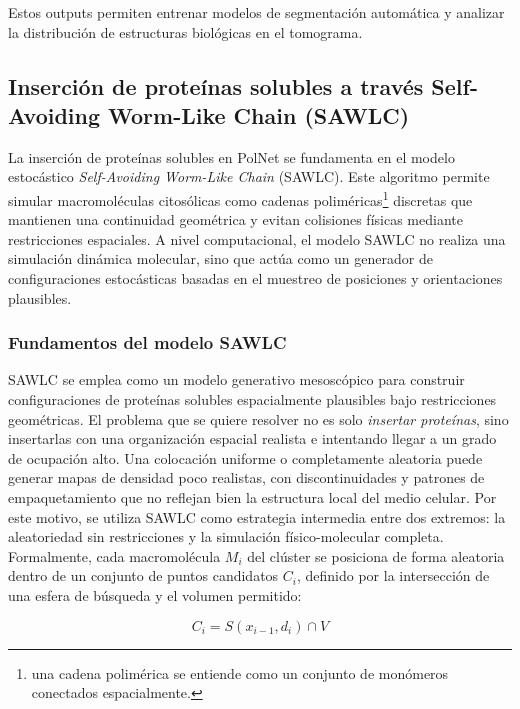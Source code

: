 Estos outputs permiten entrenar modelos de segmentación automática y analizar la distribución de estructuras biológicas en el tomograma.

\subsection{Inserción de proteínas solubles a través Self-Avoiding Worm-Like Chain (SAWLC)}

La inserción de proteínas solubles en PolNet se fundamenta en el modelo estocástico \textit{Self-Avoiding Worm-Like Chain} (SAWLC). Este algoritmo permite simular macromoléculas citosólicas como {cadenas poliméricas}\footnote{una cadena polimérica se entiende como un conjunto de monómeros conectados espacialmente.} discretas que mantienen una continuidad geométrica y evitan colisiones físicas mediante restricciones espaciales. A nivel computacional, el modelo SAWLC no realiza una simulación dinámica molecular, sino que actúa como un generador de configuraciones estocásticas basadas en el muestreo de posiciones y orientaciones plausibles.


\subsubsection{Fundamentos del modelo SAWLC}

SAWLC se emplea como un modelo generativo mesoscópico para construir configuraciones de proteínas solubles espacialmente plausibles bajo restricciones geométricas. El problema que se quiere resolver no es solo \textit{insertar proteínas}, sino insertarlas con una organización espacial realista e intentando llegar a un grado de ocupación alto. Una colocación uniforme o completamente aleatoria puede generar mapas de densidad poco realistas, con discontinuidades y patrones de empaquetamiento que no reflejan bien la estructura local del medio celular. Por este motivo, se utiliza SAWLC como estrategia intermedia entre dos extremos: la aleatoriedad sin restricciones y la simulación físico-molecular completa.\\

Formalmente, cada macromolécula $M_i$ del clúster se posiciona de forma aleatoria dentro de un conjunto de puntos candidatos $C_i$, definido por la intersección de una esfera de búsqueda y el volumen permitido:

\begin{equation}
C_i = S(x_{i-1}, d_i) \cap V
\end{equation}

